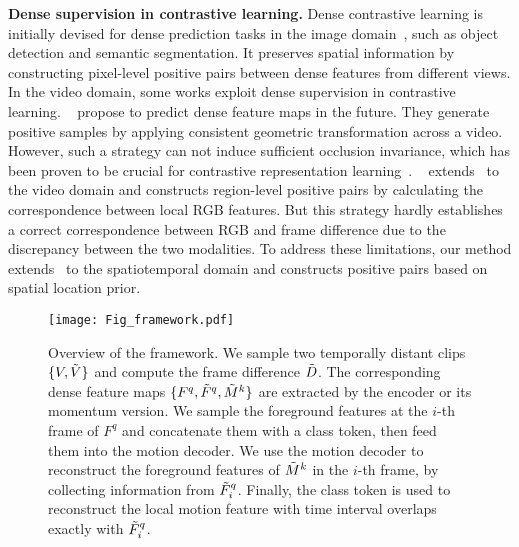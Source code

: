 \documentclass[sigconf,screen]{acmart}
\begin{document}
\noindent
{\bf Dense supervision in contrastive learning.} Dense contrastive learning is initially devised for dense prediction tasks in the image domain~\cite{DenseCL,PixPro}, such as object detection and semantic segmentation. It preserves spatial information by constructing pixel-level positive pairs between dense features from different views. 
In the video domain, some works exploit dense supervision in contrastive learning. ~\cite{DensePredictiveCoding,MemoryAug,ContextAndMotionDecoup} propose to predict dense feature maps in the future. They generate positive samples by applying consistent geometric transformation across a video. However, such a strategy can not induce sufficient occlusion invariance, which has been proven to be crucial for contrastive representation learning~\cite{Demystifying}. ~\cite{Contextualized} extends~\cite{DenseCL} to the video domain and constructs region-level positive pairs by calculating the correspondence between local RGB features. But this strategy hardly establishes a correct correspondence between RGB and frame difference due to the discrepancy between the two modalities. To address these limitations, our method extends~\cite{PixPro} to the spatiotemporal domain and constructs positive pairs based on spatial location prior.

\begin{figure*}[htb]
\begin{center}
\texttt{[image: Fig\_framework.pdf]}
\end{center}
\caption{Overview of the framework. We sample two temporally distant clips $\{V, \Tilde{V}\}$ and compute the frame difference $\Tilde{D}$. The corresponding dense feature maps $\{F^q, \Tilde{F}^q, \Tilde{M}^k\}$ are extracted by the encoder or its momentum version. We sample the foreground features at the $i$-th frame of $F^q$ and concatenate them with a class token, then feed them into the motion decoder. We use the motion decoder to reconstruct the foreground features of $\Tilde{M}^k$ in the $i$-th frame, by collecting information from $\Tilde{F}_i^q$. Finally, the class token is used to reconstruct the local motion feature with time interval overlaps exactly with $\Tilde{F}_i^q$. 
}
\label{framework}
\end{figure*}
\end{document}
